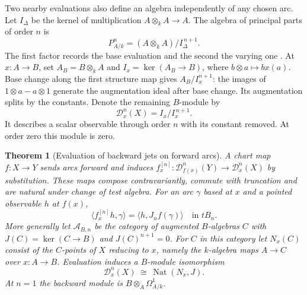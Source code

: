 \documentclass[11pt,a4paper]{article}
\newtheorem{theorem}{Theorem}[section]
\theoremstyle{definition}
\theoremstyle{remark}\newaliascnt{remark}{theorem}
\numberwithin{equation}{section}
\begin{document}
Two nearby evaluations also define an algebra independently of any chosen arc. Let $I_\Delta$ be the kernel of multiplication $A\otimes_k A\to A$. The algebra of principal parts of order $n$ is
\[
       P^n_{A/k}=(A\otimes_k A)/I_\Delta^{\,n+1}.
\]
The first factor records the base evaluation and the second the varying one \cite{stacks:parts}. At $x:A\to B$, set $A_{B}=B\otimes_k A$ and $I_x=\ker(A_B\to B)$, where $b\otimes a\mapsto bx(a)$. Base change along the first structure map gives $A_B/I_x^{n+1}$: the images of $1\otimes a-a\otimes1$ generate the augmentation ideal after base change. Its augmentation splits by the constants. Denote the remaining $B$-module by
\[
             \mathcal D_x^{n}(X)=I_x/I_x^{\,n+1}.
\]
It describes a scalar observable through order $n$ with its constant removed. At order zero this module is zero.
\begin{theorem}[Evaluation of backward jets on forward arcs]\label{thm:jet-pairing}
A chart map $f:X\to Y$ sends arcs forward and induces
$f_x^{[n]}:\mathcal D_{f(x)}^n(Y)\to\mathcal D_x^n(X)$ by substitution. These maps compose contravariantly, commute with truncation and are natural under change of test algebra. For an arc $\gamma$ based at $x$ and a pointed observable $h$ at $f(x)$,
\[
       \langle f_x^{[n]}h,\gamma\rangle
        =\langle h,J_n f(\gamma)\rangle\quad\text{in }t B_n .
\]
More generally let $\mathcal A_{B,n}$ be the category of augmented $B$-algebras $C$ with $J(C)=\ker(C\to B)$ and $J(C)^{n+1}=0$. For $C$ in this category let $N_x(C)$ consist of the $C$-points of $X$ reducing to $x$, namely the $k$-algebra maps $A\to C$ over $x:A\to B$. Evaluation induces a $B$-module isomorphism
\[
  \mathcal D_x^n(X)\ \cong\ \operatorname{Nat}(N_x,J).
\]
At $n=1$ the backward module is $B\otimes_A\Omega^1_{A/k}$.
\end{theorem}
\end{document}
